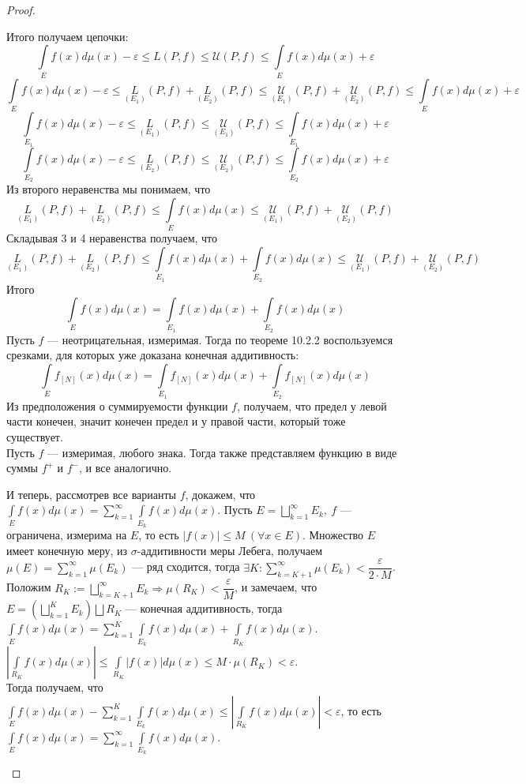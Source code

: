 \begin{proof}
\begin{enumerate}
	Итого получаем цепочки: 
	$$\int\limits_E f(x)d\mu(x)-\varepsilon\leqslant
	L(P,f) \leqslant\mathcal{U}(P,f) \leqslant
	\int\limits_E f(x)d\mu(x)+\varepsilon$$
	$$\int\limits_E f(x)d\mu(x)-\varepsilon\leqslant
		\underset{(E_1)}{L}(P,f)+\underset{(E_2)}{L}(P,f)\leqslant
	\underset{(E_1)}{\mathcal{U}}(P,f)+\underset{(E_2)}{\mathcal{U}}(P,f)\leqslant
	\int\limits_E f(x)d\mu(x)+\varepsilon$$
	$$\int\limits_{E_1}f(x)d\mu(x)-\varepsilon \leqslant \underset{(E_1)}{L}(P,f) \leqslant \underset{(E_1)}{\mathcal{U}}(P,f)\leqslant \int\limits_{E_1}f(x)d\mu(x)+\varepsilon$$
	$$\int\limits_{E_2}f(x)d\mu(x)-\varepsilon \leqslant \underset{(E_2)}{L}(P,f) \leqslant \underset{(E_2)}{\mathcal{U}}(P,f)\leqslant \int\limits_{E_2}f(x)d\mu(x)+\varepsilon$$
	 Из второго неравенства мы понимаем, что
	 $$\underset{(E_1)}{L}(P,f)+\underset{(E_2)}{L}(P,f)\leqslant\int\limits_E f(x)d\mu(x) \leqslant
	\underset{(E_1)}{\mathcal{U}}(P,f)+\underset{(E_2)}{\mathcal{U}}(P,f)$$
	Складывая 3 и 4 неравенства получаем, что
	$$\underset{(E_1)}{L}(P,f)+\underset{(E_2)}{L}(P,f)\leqslant\int\limits_{E_1}f(x)d\mu(x)+\int\limits_{E_2}f(x)d\mu(x) \leqslant
	\underset{(E_1)}{\mathcal{U}}(P,f)+\underset{(E_2)}{\mathcal{U}}(P,f)$$
	Итого $$\int\limits_E f(x)d\mu(x)=\int\limits_{E_1} f(x)d\mu(x)+\int\limits_{E_2} f(x)d\mu(x)$$
	Пусть $f$ --- неотрицательная, измеримая. Тогда по теореме 10.2.2 воспользуемся срезками, для которых уже доказана конечная аддитивность:
	$$\int\limits_{E}f_{[N]}(x)d\mu(x)=\int\limits_{E_1}f_{[N]}(x)d\mu(x)+\int\limits_{E_2}f_{[N]}(x)d\mu(x)$$
	Из предположения о суммируемости функции $f$, получаем, что предел у левой части конечен, значит конечен предел и у правой части, который тоже существует.\\
	Пусть $f$ --- измеримая, любого знака. Тогда также представляем функцию в виде суммы $f^+$ и $f^-$, и все аналогично.
	
	И теперь, рассмотрев все варианты $f$, докажем, что $\int\limits_E f(x)d\mu(x) = \sum\limits_{k=1}^\infty\int\limits_{E_k} f(x)d\mu(x)$. Пусть $E=\bigsqcup\limits_{k=1}^\infty E_k,\  f$ --- ограничена, измерима на $E$, то есть 
	${|f(x)|\leqslant M\ (\forall x\in E)}$. Множество $E$ имеет конечную меру, из $\sigma$-аддитивности меры Лебега, получаем $\mu(E)=\sum\limits_{k=1}^\infty \mu(E_k)$ --- ряд сходится, тогда
	${\exists K: \sum\limits_{k=K+1}^\infty \mu(E_k)<\dfrac{\varepsilon}{2\cdot M}}$. \\
	Положим $R_K:=\bigsqcup\limits_{k=K+1}^\infty E_k \Rightarrow \mu(R_K)<\dfrac{\varepsilon}{M}$, и замечаем, что $E=(\bigsqcup\limits_{k=1}^K E_k)\bigsqcup R_K$ --- конечная аддитивность, тогда $\int\limits_{E}f(x) d\mu(x)=\sum\limits_{k=1}^K\int\limits_{E_k}f(x)d\mu(x)+\int\limits_{R_K}f(x)d\mu(x)$.\\
	$|\int\limits_{R_K}f(x)d\mu(x)|\leqslant\int\limits_{R_K}|f(x)|d\mu(x)\leqslant M\cdot \mu(R_K)<\varepsilon$. \\Тогда получаем, что $\int\limits_{E}f(x) d\mu(x)-\sum\limits_{k=1}^K\int\limits_{E_k}f(x)d\mu(x)\leqslant|\int\limits_{R_K}f(x)d\mu(x)|<\varepsilon$, то есть $\int\limits_{E}f(x) d\mu(x)=\sum\limits_{k=1}^\infty\int\limits_{E_k}f(x)d\mu(x)$.
	

\end{enumerate}
\end{proof}
